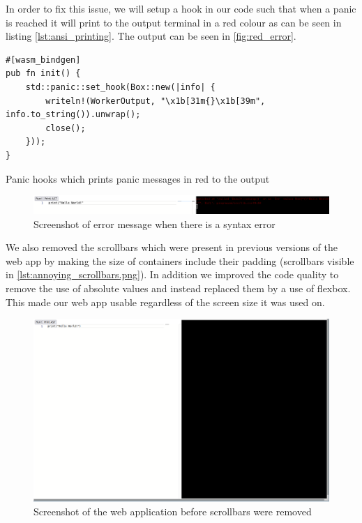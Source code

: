 \documentclass{article}
\begin{document}
In order to fix this issue, we will setup a hook in our code such that when a
panic is reached it will print to the output terminal in a red colour as can be
seen in listing \ref{lst:ansi_printing}. The output can be seen in
\autoref{fig:red_error}.

\begin{listing}
	\begin{verbatim}
#[wasm_bindgen]
pub fn init() {
    std::panic::set_hook(Box::new(|info| {
        writeln!(WorkerOutput, "\x1b[31m{}\x1b[39m", info.to_string()).unwrap();
        close();
    }));
}
	\end{verbatim}
	\caption{Panic hooks which prints panic messages in red to the output}
	\label{lst:ansi_printing}
\end{listing}

\begin{figure}
	\includegraphics[width=\textwidth]{red_error}
	\caption{Screenshot of error message when there is a syntax error}
	\label{fig:red_error}
\end{figure}

We also removed the scrollbars which were present in previous versions of the
web app by making the size of containers include their padding (scrollbars
visible in \autoref{lst:annoying_scrollbars.png}). In addition we improved the
code quality to remove the use of absolute values and instead replaced them by
a use of flexbox. This made our web app usable regardless of the screen size it
was used on.

\begin{figure}
	\includegraphics[width=\textwidth]{annoying_scrollbars}
	\caption{Screenshot of the web application before scrollbars were removed}
	\label{fig:annoying_scrollbars}
\end{figure}
\end{document}
